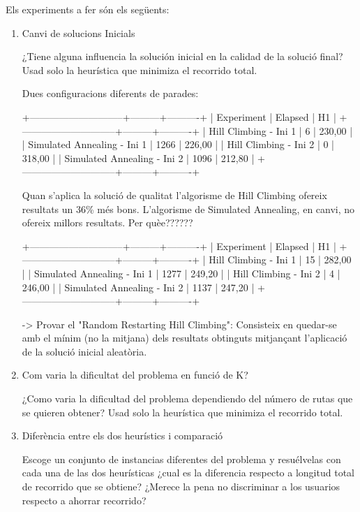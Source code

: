 
Els experiments a fer són els següents:

\begin{enumerate}
\item Canvi de solucions Inicials

	¿Tiene alguna influencia la solución inicial en la calidad de la solució final? Usad solo
	la heurística que minimiza el recorrido total.

Dues configuracions diferents de parades:

	+-----------------------------+---------+----------+
	|                 Experiment  | Elapsed |    H1    |
	+-----------------------------+---------+----------+
	|       Hill Climbing - Ini 1 |       6 |   230,00 |
	| Simulated Annealing - Ini 1 |    1266 |   226,00 |
	|       Hill Climbing - Ini 2 |       0 |   318,00 |
	| Simulated Annealing - Ini 2 |    1096 |   212,80 |
	+-----------------------------+---------+----------+
	
	Quan s'aplica la solució de qualitat l'algorisme de Hill Climbing ofereix resultats un 36\% més bons. L'algorisme de Simulated Annealing, en canvi, no ofereix millors resultats. Per quèe??????
	
	+-----------------------------+---------+----------+
	|                 Experiment  | Elapsed |    H1    |
	+-----------------------------+---------+----------+
	|       Hill Climbing - Ini 1 |      15 |   282,00 |
	| Simulated Annealing - Ini 1 |    1277 |   249,20 |
	|       Hill Climbing - Ini 2 |       4 |   246,00 |
	| Simulated Annealing - Ini 2 |    1137 |   247,20 |
	+-----------------------------+---------+----------+
	
	
	
	-> Provar el "Random Restarting Hill Climbing": Consisteix en quedar-se amb el mínim (no la mitjana) dels resultats obtinguts mitjançant l'aplicació de la solució inicial aleatòria.

\item Com varia la dificultat del problema en funció de K?

		¿Como varia la dificultad del problema dependiendo del número de rutas que se quieren obtener? Usad solo la heurística que minimiza el recorrido total.

\item Diferència entre els dos heurístics i comparació

Escoge un conjunto de instancias diferentes del problema y resuélvelas con cada una de las dos heurísticas ¿cual es la diferencia respecto a longitud total de recorrido que se obtiene? ¿Merece la pena no discriminar a los usuarios respecto a ahorrar recorrido?


\end{enumerate}
